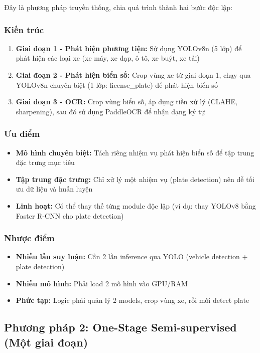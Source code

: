 Đây là phương pháp truyền thống, chia quá trình thành hai bước độc lập:

\subsubsection{Kiến trúc}
\begin{enumerate}
    \item \textbf{Giai đoạn 1 - Phát hiện phương tiện:} Sử dụng YOLOv8n (5 lớp) để phát hiện các loại xe (xe máy, xe đạp, ô tô, xe buýt, xe tải)
    \item \textbf{Giai đoạn 2 - Phát hiện biển số:} Crop vùng xe từ giai đoạn 1, chạy qua YOLOv8n chuyên biệt (1 lớp: license\_plate) để phát hiện biển số
    \item \textbf{Giai đoạn 3 - OCR:} Crop vùng biển số, áp dụng tiền xử lý (CLAHE, sharpening), sau đó sử dụng PaddleOCR để nhận dạng ký tự
\end{enumerate}

\subsubsection{Ưu điểm}
\begin{itemize}
    \item \textbf{Mô hình chuyên biệt:} Tách riêng nhiệm vụ phát hiện biển số để tập trung đặc trưng mục tiêu
    \item \textbf{Tập trung đặc trưng:} Chỉ xử lý một nhiệm vụ (plate detection) nên dễ tối ưu dữ liệu và huấn luyện
    \item \textbf{Linh hoạt:} Có thể thay thế từng module độc lập (ví dụ: thay YOLOv8 bằng Faster R-CNN cho plate detection)
\end{itemize}

\subsubsection{Nhược điểm}
\begin{itemize}
    \item \textbf{Nhiều lần suy luận:} Cần 2 lần inference qua YOLO (vehicle detection + plate detection)
    \item \textbf{Nhiều mô hình:} Phải load 2 mô hình vào GPU/RAM
    \item \textbf{Phức tạp:} Logic phải quản lý 2 models, crop vùng xe, rồi mới detect plate
\end{itemize}

\subsection{Phương pháp 2: One-Stage Semi-supervised (Một giai đoạn)}

